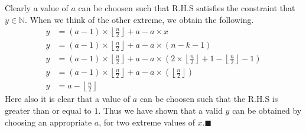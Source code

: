\documentclass[10pt, twoside]{article}
\newcommand{\floordivision}[2]{\left\lfloor \frac{#1}{#2} \right\rfloor}
\begin{document}
Clearly a value of $a$ can be choosen such that R.H.S satisfies the constraint that $y \in \mathbb{N}$. When we think of the other extreme, we obtain the following.
\begin{align*}
	y &= (a-1)\times \floordivision{n}{2} + a - a\times x \\
	y &= (a-1)\times \floordivision{n}{2} + a - a\times (n-k-1) \\
	y &= (a-1)\times \floordivision{n}{2} + a - a\times (2\times \floordivision{n}{2} + 1-\floordivision{n}{2}-1) \\
	y &= (a-1)\times \floordivision{n}{2} + a - a\times (\floordivision{n}{2}) \\
	y &= a - \floordivision{n}{2}
\end{align*}
Here also it is clear that a value of \textbf{$a$} can be choosen such that the R.H.S is greater than or equal to $1$. \newline
Thus we have shown that a valid $y$ can be obtained by choosing an appropriate $a$, for two extreme values of $x$.$\blacksquare$
\end{document}
